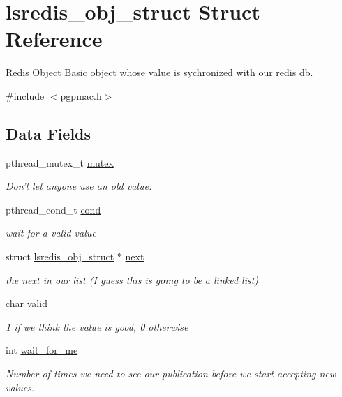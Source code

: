 \hypertarget{structlsredis__obj__struct}{\section{lsredis\-\_\-obj\-\_\-struct Struct Reference}
\label{structlsredis__obj__struct}
}


Redis Object Basic object whose value is sychronized with our redis db.  




{\ttfamily \#include $<$pgpmac.\-h$>$}

\subsection*{Data Fields}
\begin{DoxyCompactItemize}
\item 
pthread\-\_\-mutex\-\_\-t \hyperlink{structlsredis__obj__struct_a0da18e7d0f7d52459bbc6fbc696d5252}{mutex}
\begin{DoxyCompactList}\small\item\em Don't let anyone use an old value. \end{DoxyCompactList}\item 
pthread\-\_\-cond\-\_\-t \hyperlink{structlsredis__obj__struct_a356f6a228bb19ac7d66fdb1c875d68be}{cond}
\begin{DoxyCompactList}\small\item\em wait for a valid value \end{DoxyCompactList}\item 
struct \hyperlink{structlsredis__obj__struct}{lsredis\-\_\-obj\-\_\-struct} $\ast$ \hyperlink{structlsredis__obj__struct_afb7259e8c3c1c83ccc234b2b2894f2b0}{next}
\begin{DoxyCompactList}\small\item\em the next in our list (I guess this is going to be a linked list) \end{DoxyCompactList}\item 
char \hyperlink{structlsredis__obj__struct_a338ffa4123bd06b39c8b58f5e695575e}{valid}
\begin{DoxyCompactList}\small\item\em 1 if we think the value is good, 0 otherwise \end{DoxyCompactList}\item 
int \hyperlink{structlsredis__obj__struct_a8bc1a536b7155a1e2a749c7c434b898b}{wait\-\_\-for\-\_\-me}
\begin{DoxyCompactList}\small\item\em Number of times we need to see our publication before we start accepting new values. \end{DoxyCompactList}\item 

\end{DoxyCompactItemize}
